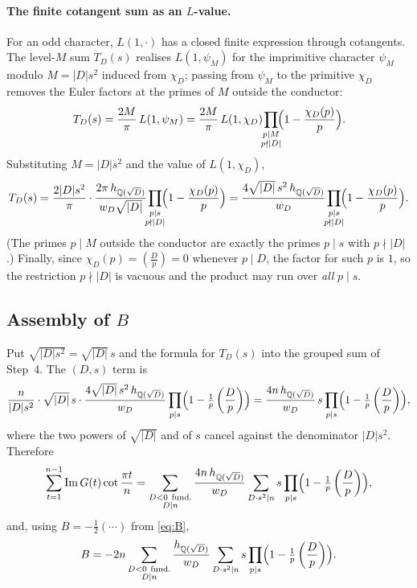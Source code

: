 \documentclass[11pt]{article}
\newcommand{\leg}[2]{\left(\frac{#1}{#2}\right)}
\DeclareMathOperator{\Imag}{Im}
\begin{document}
\paragraph{The finite cotangent sum as an $L$-value.}
For an odd character, $L(1,\cdot)$ has a closed finite expression through cotangents. The level-$M$ sum
$T_D(s)$ realises $L(1,\psi_M)$ for the imprimitive character $\psi_M$ modulo $M=|D|s^2$ induced from $\chi_D$;
passing from $\psi_M$ to the primitive $\chi_D$ removes the Euler factors at the primes of $M$ outside the
conductor:
\[
T_D(s)=\frac{2M}{\pi}\,L(1,\psi_M)
=\frac{2M}{\pi}\,L(1,\chi_D)\!\!\prod_{\substack{p\mid M\\ p\nmid|D|}}\!\!\Bigl(1-\frac{\chi_D(p)}{p}\Bigr).
\]
Substituting $M=|D|s^2$ and the value of $L(1,\chi_D)$,
\[
T_D(s)=\frac{2|D|s^2}{\pi}\cdot\frac{2\pi\,h_{\mathbb{Q}(\sqrt D)}}{w_D\sqrt{|D|}}\!\!
\prod_{\substack{p\mid s\\ p\nmid|D|}}\!\!\Bigl(1-\frac{\chi_D(p)}{p}\Bigr)
=\frac{4\sqrt{|D|}\,s^2\,h_{\mathbb{Q}(\sqrt D)}}{w_D}\!\!\prod_{\substack{p\mid s\\ p\nmid|D|}}\!\!\Bigl(1-\frac{\chi_D(p)}{p}\Bigr).
\]
(The primes $p\mid M$ outside the conductor are exactly the primes $p\mid s$ with $p\nmid|D|$.) Finally, since
$\chi_D(p)=\leg{D}{p}=0$ whenever $p\mid D$, the factor for such $p$ is $1$, so the restriction $p\nmid|D|$ is
vacuous and the product may run over \emph{all} $p\mid s$.

\subsection{Assembly of $B$}
Put $\sqrt{|D|s^2}=\sqrt{|D|}\,s$ and the formula for $T_D(s)$ into the grouped sum of Step~4. The $(D,s)$ term is
\[
\frac{n}{|D|s^2}\cdot\sqrt{|D|}\,s\cdot\frac{4\sqrt{|D|}\,s^2\,h_{\mathbb{Q}(\sqrt D)}}{w_D}\prod_{p\mid s}\Bigl(1-\tfrac1p\leg Dp\Bigr)
=\frac{4n\,h_{\mathbb{Q}(\sqrt D)}}{w_D}\,s\prod_{p\mid s}\Bigl(1-\tfrac1p\leg Dp\Bigr),
\]
where the two powers of $\sqrt{|D|}$ and of $s$ cancel against the denominator $|D|s^2$. Therefore
\[
\sum_{t=1}^{n-1}\Imag G(t)\cot\frac{\pi t}{n}
=\sum_{\substack{D<0\ \text{fund.}\\ D\mid n}}\frac{4n\,h_{\mathbb{Q}(\sqrt D)}}{w_D}\sum_{D\cdot s^2\mid n}s\prod_{p\mid s}\Bigl(1-\tfrac1p\leg Dp\Bigr),
\]
and, using $B=-\tfrac12(\cdots)$ from \eqref{eq:B},
\begin{equation}\label{eq:Bval}
B=-2n\sum_{\substack{D<0\ \text{fund.}\\ D\mid n}}\frac{h_{\mathbb{Q}(\sqrt D)}}{w_D}\sum_{D\cdot s^2\mid n}s\prod_{p\mid s}\Bigl(1-\tfrac1p\leg Dp\Bigr).
\end{equation}
\end{document}
